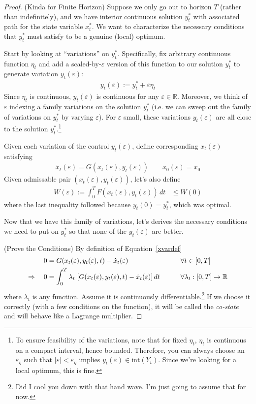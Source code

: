 \documentclass[12pt]{article}
\numberwithin{equation}{section} %
\theoremstyle{plain}
\theoremstyle{definition}
\theoremstyle{remark}
\newcommand{\R}{\mathbb{R}}
\begin{document}
\begin{proof}{(Kinda for Finite Horizon)}
Suppose we only go out to horizon $T$ (rather than indefinitely), and we
have interior continuous solution $y^*_t$ with associated path for the
state variable $x_t^*$. We want to characterize the necessary conditions
that $y_t^*$ must satisfy to be a genuine (local) optimum.

Start by looking at ``variations'' on $y_t^*$. Specifically,
fix arbitrary continuous function $\eta_t$ and add a
scaled-by-$\varepsilon$ version of this function to our solution $y_t^*$
to generate variation $y_t(\varepsilon)$:
\begin{align*}
  y_t(\varepsilon) := y_t^* + \varepsilon\eta_t
\end{align*}
Since $\eta_t$ is continuous, $y_t(\varepsilon)$ is continuous for any
$\varepsilon\in\R$.
Moreover, we think of $\varepsilon$ indexing a family variations on the
solution $y_t^*$ (i.e. we can sweep out the family of variations on
$y_t^*$ by varying $\varepsilon$). For $\varepsilon$ small, these
variations $y_t(\varepsilon)$ are all close to the solution
$y_t^*$.\footnote{%
  To ensure feasibility of the variations, note that for fixed $\eta_t$,
  $\eta_t$ is continuous on a compact interval, hence bounded.
  Therefore, you can always choose an $\varepsilon_\eta$ such that
  $|\varepsilon| < \varepsilon_\eta$
  implies $y_t(\varepsilon) \in \text{int}(Y_t)$.
  Since we're looking for a local optimum, this is fine.
}

Given each variation of the control $y_t(\varepsilon)$, define
corresponding $x_t(\varepsilon)$ satisfying
\begin{align}
  \dot{x}_t(\varepsilon)
  = G(x_t(\varepsilon), y_t(\varepsilon))
  \qquad x_0(\varepsilon)=x_0
  \label{xvardef}
\end{align}
Given admissable pair $(x_t(\varepsilon), y_t(\varepsilon))$, let's also
define
\begin{align}
  W(\varepsilon) :=
  \int^{T}_0 F(x_t(\varepsilon), y_t(\varepsilon)) \, dt
  &\leq W(0) \label{Weps}
\end{align}
where the last inequality followed because $y_t(0)=y_t^*$, which was
optimal.

Now that we have this family of variations, let's derives the necessary
conditions we need to put on $y_t^*$ so that none of the
$y_t(\varepsilon)$ are better.

(Prove the Conditions)
By definition of Equation~\ref{xvardef}
\begin{alignat}{3}
  0 &= G(x_t(\varepsilon), y_t(\varepsilon), t) - \dot{x}_t(\varepsilon)
  &&\forall t\in[0,T] \notag \\
  \Rightarrow \quad
  0 &= \int^{T}_0
  \lambda_t \; [
    G(x_t(\varepsilon), y_t(\varepsilon), t) -
    \dot{x}_t(\varepsilon)
  ] \, dt
  \qquad&&\forall \lambda_t:[0,T]\rightarrow \R
  \label{lambdadef}
\end{alignat}
where $\lambda_t$ is any function. Assume it is continuously
differentiable.\footnote{%
Did I cool you down with that hand wave. I'm just going to assume that
for now.}
If we choose it correctly (with a few conditions on the function), it
will be called the \emph{co-state} and will behave like a Lagrange
multiplier.


\end{proof}
\end{document}
